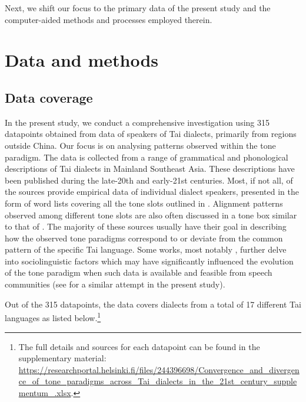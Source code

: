 \documentclass[output=paper]{langscibook}
\begin{document}
Next, we shift our focus to the primary data of the present study and the computer-aided methods and processes employed therein.

\section{Data and methods}
\label{sec:yurayong:3}
\subsection{Data coverage}
\label{sec:yurayong:3.1}
In the present study, we conduct a comprehensive investigation using 315 datapoints obtained from data of speakers of Tai dialects, primarily from regions outside China. Our focus is on analysing patterns observed within the tone paradigm. The data is collected from a range of grammatical and phonological descriptions of Tai dialects in Mainland Southeast Asia. These descriptions have been published during the late-20th and early-21st centuries. Most, if not all, of the sources provide empirical data of individual dialect speakers, presented in the form of word lists covering all the tone slots outlined in . Alignment patterns observed among different tone slots are also often discussed in a tone box similar to that of . The majority of these sources usually have their goal in describing how the observed tone paradigms correspond to or deviate from the common pattern of the specific Tai language. Some works, most notably \citet{Akkharawatthanakun2003}, further delve into sociolinguistic factors which may have significantly influenced the evolution of the tone paradigm when such data is available and feasible from speech communities (see  for a similar attempt in the present study).

Out of the 315 datapoints, the data covers dialects from a total of 17 different Tai languages as listed below.\footnote{The full details and sources for each datapoint can be found in the supplementary material: \url{https://researchportal.helsinki.fi/files/244396698/Convergence_and_divergence_of_tone_paradigms_across_Tai_dialects_in_the_21st_century_supplementum_.xlsx}.}
\end{document}
